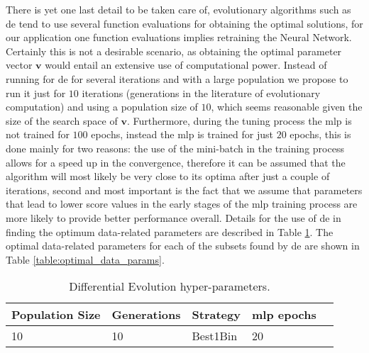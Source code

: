 There is yet one last detail to be taken care of, evolutionary algorithms such as \gls{de} tend to use several function evaluations for obtaining the optimal solutions,  for our application one function evaluations implies retraining the Neural Network. Certainly this is not a desirable scenario, as obtaining the optimal parameter vector $\mathbf{v}$ would entail an extensive use of computational power. Instead of running for \gls{de} for several iterations and with a large population we propose to run it just for $10$ iterations (generations in the literature of evolutionary computation) and using a population size of $10$, which seems reasonable given the size of the search space of $\mathbf{v}$. Furthermore, during the tuning process the \gls{mlp} is not trained for  $100$ epochs, instead the \gls{mlp} is trained for just $20$ epochs, this is done mainly for two reasons: the use of the mini-batch in the training process allows for a speed up in the convergence, therefore it can be assumed that the algorithm will most likely be very close to its optima after just a couple of iterations, second and most important is the fact that we assume that parameters that lead to lower score values in the early stages of the \gls{mlp} training process are more likely to provide better performance overall. Details for the use of \gls{de} in finding the optimum data-related parameters are described in Table \ref{table:de_hyperparams}. The optimal data-related parameters for each of the subsets found by \gls{de} are shown in Table \ref{table:optimal_data_params}.

\begin{table}[!htb]
\centering
\begin{tabular}{l l l l l}
	\hline
	 Population Size & Generations & Strategy & \gls{mlp} epochs\\
  	\hline
  	10 & 10 & Best1Bin & 20\\
  	\hline
\end{tabular}
\caption{Differential Evolution hyper-parameters.}
\label{table:de_hyperparams}
\end{table}

\begin{comment}
\begin{table}[!htb]
\centering
\begin{tabular}{l l l l l}
	\hline
	 Dataset & Window Size $n_w$ & Window Stride $n_s$ & Early RUL $R_e$\\
  	\hline
  	FD001 & 26 & 2 & 100\\
  	FD002 & 16 & 2 & 91\\
  	FD003 & 30 & 2 & 97\\
  	FD004 & 16 & 2 & 92\\
  	\hline
\end{tabular}
\caption{Optimal data-related parameters for each subset.}
\label{table:optimal_data_params}
\end{table}
\end{comment}

